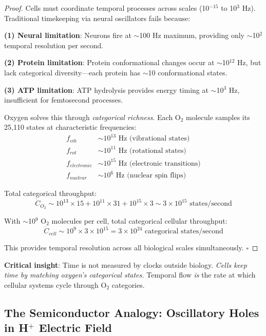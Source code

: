 \documentclass[11pt,a4paper]{article}
\begin{document}
\begin{proof}
Cells must coordinate temporal processes across scales (10$^{-15}$ to 10$^{3}$ Hz). Traditional timekeeping via neural oscillators fails because:

\textbf{(1) Neural limitation}: Neurons fire at $\sim$100 Hz maximum, providing only $\sim$10$^2$ temporal resolution per second.

\textbf{(2) Protein limitation}: Protein conformational changes occur at $\sim$10$^{12}$ Hz, but lack categorical diversity—each protein has $\sim$10 conformational states.

\textbf{(3) ATP limitation}: ATP hydrolysis provides energy timing at $\sim$10$^{3}$ Hz, insufficient for femtosecond processes.

Oxygen solves this through \textit{categorical richness}. Each O$_2$ molecule samples its 25,110 states at characteristic frequencies:
\begin{align}
f_{vib} &\sim 10^{13} \text{ Hz (vibrational states)} \\
f_{rot} &\sim 10^{11} \text{ Hz (rotational states)} \\
f_{electronic} &\sim 10^{15} \text{ Hz (electronic transitions)} \\
f_{nuclear} &\sim 10^{6} \text{ Hz (nuclear spin flips)}
\end{align}

Total categorical throughput:
\begin{equation}
\dot{C}_{O_2} \sim 10^{13} \times 15 + 10^{11} \times 31 + 10^{15} \times 3 \sim 3 \times 10^{15} \text{ states/second}
\end{equation}

With $\sim$10$^9$ O$_2$ molecules per cell, total categorical cellular throughput:
\begin{equation}
\dot{C}_{cell} \sim 10^9 \times 3 \times 10^{15} = 3 \times 10^{24} \text{ categorical states/second}
\end{equation}

This provides temporal resolution across all biological scales simultaneously. $\square$
\end{proof}

\textbf{Critical insight}: Time is not measured by clocks outside biology. \textit{Cells keep time by matching oxygen's categorical states.} Temporal flow \textit{is} the rate at which cellular systems cycle through O$_2$ categories.

\subsection{The Semiconductor Analogy: Oscillatory Holes in H$^+$ Electric Field}
\end{document}
